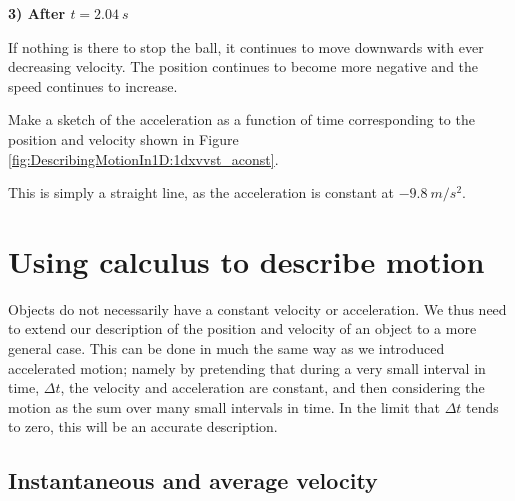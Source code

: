 \textbf{3) After $t=\SI{2.04}{s}$}

If nothing is there to stop the ball, it continues to move downwards with ever decreasing velocity. The position continues to become more negative and the speed continues to increase.

\begin{checkpoint}{Make a sketch of the acceleration as a function of time corresponding to the position and velocity shown in Figure \ref{fig:DescribingMotionIn1D:1dxvvst_aconst}.}
\begin{answer}
This is simply a straight line, as the acceleration is constant at $\SI{-9.8}{m/s^2}$.
\end{answer}
\end{checkpoint}

\section{Using calculus to describe motion}
Objects do not necessarily have a constant velocity or acceleration. We thus need to extend our description of the position and velocity of an object to a more general case. This can be done in much the same way as we introduced accelerated motion; namely by pretending that during a very small interval in time, $\Delta t$, the velocity and acceleration are constant, and then considering the motion as the sum over many small intervals in time. In the limit that $\Delta t$ tends to zero, this will be an accurate description. 

\subsection{Instantaneous and average velocity}

